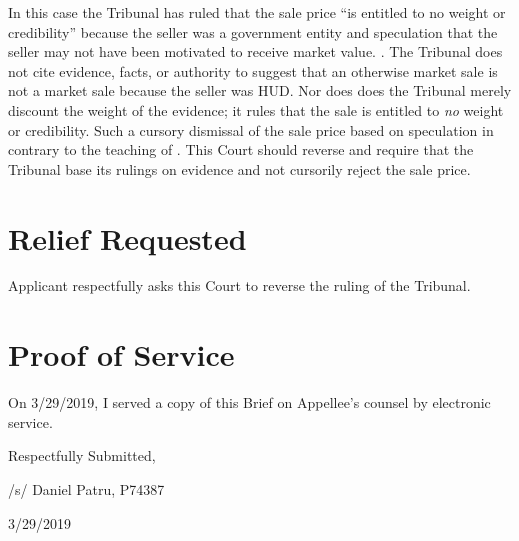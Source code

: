\documentclass[12pt,\documentclassflag]{michiganCourtOfAppealsBrief}
\begin{document}
In this case the Tribunal has ruled that the sale price ``is entitled to no weight or credibility'' because the seller was a government entity and speculation that the seller may not have been motivated to receive market value. \reconsiderationDenied[2]. The Tribunal does not cite evidence, facts, or authority to suggest that an otherwise market sale is not a market sale because the seller was HUD. Nor does does the Tribunal merely discount the weight of the evidence; it rules that the sale is entitled to {\em no} weight or credibility. Such a cursory dismissal of the sale price based on speculation in contrary to the teaching of \cite[s]{Jones & Laughlin}. This Court should reverse and require that the Tribunal base its rulings on evidence and not cursorily reject the sale price. 

\section{Relief Requested}

Applicant respectfully asks this Court to reverse the ruling of the Tribunal. 

\section{Proof of Service}

On 3/29/2019, I served a copy of this Brief on Appellee's counsel by electronic service.

\vspace{1\baselineskip}

{ \setlength{\leftskip}{3.5in}

  Respectfully Submitted,

  /s/ Daniel Patru, P74387

  3/29/2019

  \setlength{\leftskip}{0pt}}

\newpage\empty%
\end{document}
